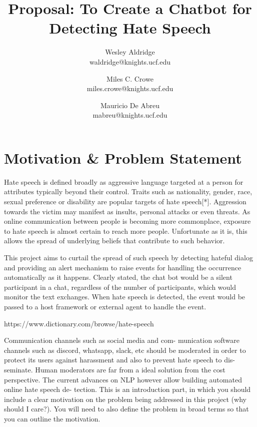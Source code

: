 \documentclass[conference]{sig-alternate-05-2015}
\begin{document}
\title{Proposal: To Create a Chatbot for Detecting Hate Speech}


\author{Wesley Aldridge\\ waldridge@knights.ucf.edu \and Miles C. Crowe  \\ miles.crowe@knights.ucf.edu \and Mauricio De Abreu\\ mabreu@knights.ucf.edu}

\maketitle


\section{Motivation \& Problem Statement}\label{sec:motivation}
Hate speech is defined broadly as aggressive language targeted at a person for attributes typically beyond their control.  Traits such as nationality, gender, race, sexual preference or disability are popular targets of hate speech[*].  Aggression towards the victim may manifest as insults, personal attacks or even threats.  As online communication between people is becoming more commonplace, exposure to hate speech is almost certain to reach more people.  Unfortunate as it is, this allows the spread of underlying beliefs that contribute to such behavior.

This project aims to curtail the spread of such speech by detecting hateful dialog and providing an alert mechanism to raise events for handling the occurrence automatically as it happens.  Clearly stated, the chat bot would be a silent participant in a chat, regardless of the number of participants, which would monitor the text exchanges.  When hate speech is detected, the event would be passed to a host framework or external agent to handle the event.


https://www.dictionary.com/browse/hate-speech

Communication channels such as social media and com-
munication software channels such as discord, whatsapp,
slack, etc should be moderated in order to protect its users
against harassment and also to prevent hate speech to dis-
seminate. Human moderators are far from a ideal solution
from the cost perspective. The current advances on NLP
however allow building automated online hate speech de-
tection.
\color{red}
This is an introduction part, in which you should include a clear motivation on the problem being addressed in this project (why should I care?). You will need to also define the problem in broad terms so that you can outline the motivation.
\end{document}
